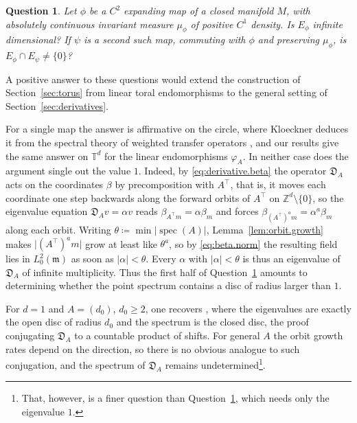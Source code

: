 \documentclass[11pt,reqno]{amsart}
\theoremstyle{plain}
\newtheorem{qst}[thm]{Question}
\theoremstyle{definition}
\newcommand{\T}{\mathbb{T}}
\newcommand{\Z}{\mathbb{Z}}
\newcommand{\Leb}{\mathfrak{m}}
\newcommand{\D}{\mathfrak{D}}
\DeclareMathOperator{\spec}{spec}
\begin{document}
\begin{qst}
\label{qst:general.eigen}
    Let \( \phi \) be a \( C^2 \) expanding map of a closed manifold \( M \), with absolutely continuous invariant measure \( \mu_\phi \) of positive \( C^1 \) density.
    Is \( E_\phi \) infinite dimensional?
    If \( \psi \) is a second such map, commuting with \( \phi \) and preserving \( \mu_\phi \), is \( E_\phi\cap E_\psi\neq\{0\} \)?
\end{qst}

A positive answer to these questions would extend the construction of Section~\ref{sec:torus} from linear toral endomorphisms to the general setting of Section~\ref{sec:derivatives}.

For a single map the answer is affirmative on the circle, where Kloeckner deduces it \cite[Proposition 5.3]{kloeckner_optimal_2013} from the spectral theory of weighted transfer operators \cite[Theorem 2.5]{baladi_positive_2000}, and our results give the same answer on \( \T^d \) for the linear endomorphisms \( \varphi_A \).
In neither case does the argument single out the value \( 1 \).
Indeed, by \eqref{eq:derivative.beta} the operator \( \D_A \) acts on the coordinates \( \beta \) by precomposition with \( A^{\top} \), that is, it moves each coordinate one step backwards along the forward orbits of \( A^{\top} \) on \( \Z^d\setminus\{0\} \), so the eigenvalue equation \( \D_Av=\alpha v \) reads \( \beta_{A^{\top}m}=\alpha\beta_m \) and forces \( \beta_{(A^{\top})^am}=\alpha^a\beta_m \) along each orbit.
Writing \( \theta\coloneqq\min\lvert\spec(A)\rvert \), Lemma~\ref{lem:orbit.growth} makes \( \lvert(A^{\top})^am\rvert \) grow at least like \( \theta^a \), so by \eqref{eq:beta.norm} the resulting field lies in \( L^2_0(\Leb) \) as soon as \( \lvert\alpha\rvert<\theta \).
Every \( \alpha \) with \(\lvert \alpha \rvert < \theta\) is thus an eigenvalue of \( \D_A \) of infinite multiplicity.
Thus the first half of Question~\ref{qst:general.eigen} amounts to determining whether the point spectrum contains a disc of radius larger than \(1\).

For \( d=1 \) and \( A=(d_0) \), \( d_0\ge2 \), one recovers \cite[Proposition 4.4]{kloeckner_optimal_2013}, where the eigenvalues are exactly the open disc of radius \( d_0 \) and the spectrum is the closed disc, the proof conjugating \( \D_A \) to a countable product of shifts.
For general \( A \) the orbit growth rates depend on the direction, so there is no obvious analogue to such conjugation, and the spectrum of \( \D_A \) remains undetermined\footnote{
    That, however, is a finer question than Question~\ref{qst:general.eigen}, which needs only the eigenvalue \( 1 \).
}.
\end{document}
